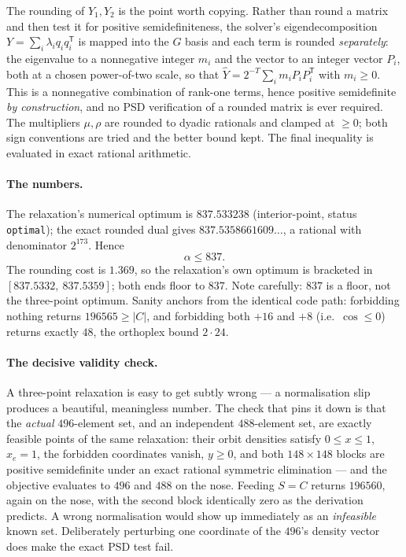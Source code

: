 \documentclass[10pt,a4paper]{article}
\begin{document}
The rounding of $Y_1, Y_2$ is the point worth copying. Rather than round a matrix and then test it
for positive semidefiniteness, the solver's eigendecomposition $Y = \sum_i \lambda_i q_i q_i^{\mathsf T}$
is mapped into the $G$ basis and each term is rounded \emph{separately}: the eigenvalue to a
nonnegative integer $m_i$ and the vector to an integer vector $P_i$, both at a chosen power-of-two
scale, so that $\widehat{Y} = 2^{-T}\sum_i m_i P_i P_i^{\mathsf T}$ with $m_i \ge 0$. This is a
nonnegative combination of rank-one terms, hence positive semidefinite \emph{by construction}, and
no PSD verification of a rounded matrix is ever required. The multipliers $\mu, \rho$ are rounded to
dyadic rationals and clamped at $\ge 0$; both sign conventions are tried and the better bound kept.
The final inequality is evaluated in exact rational arithmetic.

\paragraph{The numbers.} The relaxation's numerical optimum is $837.533238$ (interior-point,
status \texttt{optimal}); the exact rounded dual gives
$837.5358661609\ldots$, a rational with denominator $2^{173}$. Hence
\[
  \boxed{\ \alpha \le 837.\ }
\]
The rounding cost is $1.369$, so the relaxation's own optimum is bracketed in
$[837.5332,\ 837.5359]$; both ends floor to $837$. Note carefully: $837$ is a floor, not the
three-point optimum. Sanity anchors from the identical code path: forbidding nothing returns
$196565 \ge |C|$, and forbidding both $+16$ and $+8$ (i.e.\ $\cos \le 0$) returns exactly $48$,
the orthoplex bound $2 \cdot 24$.

\paragraph{The decisive validity check.} A three-point relaxation is easy to get subtly wrong ---
a normalisation slip produces a beautiful, meaningless number. The check that pins it down is
that the \emph{actual} $496$-element set, and an independent $488$-element set, are exactly feasible
points of the same relaxation: their orbit densities satisfy $0 \le x \le 1$, $x_e = 1$, the
forbidden coordinates vanish, $y \ge 0$, and both $148 \times 148$ blocks are positive semidefinite
under an exact rational symmetric elimination --- and the objective evaluates to $496$ and $488$ on
the nose. Feeding $S = C$ returns $196560$, again on the nose, with the second block identically
zero as the derivation predicts. A wrong normalisation would show up immediately as an
\emph{infeasible} known set. Deliberately perturbing one coordinate of the $496$'s density vector
does make the exact PSD test fail.
\end{document}
